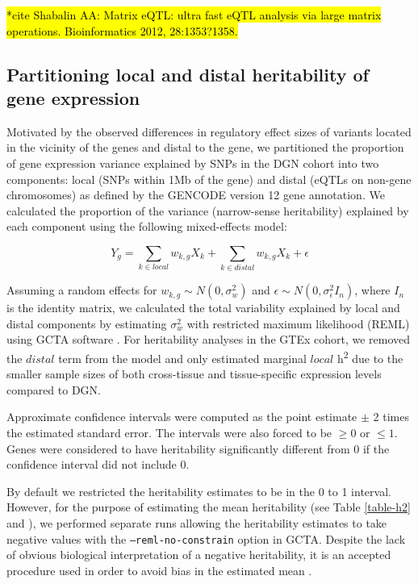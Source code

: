 \documentclass[10pt,letterpaper]{article}
\begin{document}
\hl{*cite Shabalin AA: Matrix eQTL: ultra fast eQTL analysis via large matrix operations. Bioinformatics 2012, 28:1353?1358.}
\cite{shabalin2012matrix}

\subsection*{Partitioning local and distal heritability of gene
expression}\label{partitioning-local-and-distal-heritability-of-gene-expression}

Motivated by the observed differences in regulatory effect sizes of variants located in the vicinity of the genes and distal to the gene,
we partitioned the proportion of gene expression variance explained by
SNPs in the DGN cohort into two components: local (SNPs within 1Mb of
the gene) and distal (eQTLs on non-gene chromosomes) as defined by the
GENCODE \cite{Harrow_2012} version 12 gene annotation. We calculated the
proportion of the variance (narrow-sense heritability) explained by each
component using the following mixed-effects model:

\[ Y_g = \sum_{k  \in local}w_{k,g} X_k + \sum_{k  \in distal}w_{k,g} X_k + \epsilon \]

Assuming a random effects for \(w_{k,g} \sim N(0, \sigma^2_w)\) and
\(\epsilon \sim N(0, \sigma^2_{\epsilon} I_n)\), where \(I_n\) is the
identity matrix, we calculated the total variability explained by local
and distal components by estimating \(\sigma^2_w\) with restricted
maximum likelihood (REML) using GCTA software \cite{Yang_2011}. For heritability
analyses in the GTEx cohort, we removed the \(distal\) term from the
model and only estimated marginal \(local\) h\textsuperscript{2} due to
the smaller sample sizes of both cross-tissue and tissue-specific
expression levels compared to DGN. 

Approximate confidence intervals were computed as the point estimate $\pm$ 
2 times the estimated standard error. The intervals were also forced to be $\ge 0 $ or $\le 1$. 
Genes were considered to have heritability significantly different from 0 if the confidence interval did not include 0.

By default we restricted the heritability estimates to be in the 0 to 1 interval. However, 
for the purpose of estimating the mean heritability (see Table \ref{table-h2} and ), we performed separate runs allowing the heritability estimates to 
take negative values with the \texttt{--reml-no-constrain} option in GCTA. Despite the lack of obvious biological interpretation of a negative heritability, 
it is an accepted procedure used in order to avoid bias in the estimated mean \cite{Price_2011,Wright_2014}.
\end{document}
